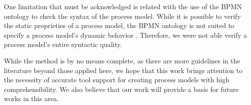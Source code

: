 \documentclass[a4paper,twoside]{article}
\begin{document}
One limitation that must be acknowledged is related with the use of the BPMN ontology to check the syntax of the process model. While it is possible to verify the static proprieties of a process model, the BPMN ontology is not suited to specify  a process model's dynamic behavior \citep{Rospocher2014foisbpmn}. Therefore, we were not able verify a process model's entire syntactic quality.

While the method is by no means complete, as there are more guidelines in the literature beyond those applied here, we hope that this work brings attention to the necessity of accurate tool support for creating process models with high comprehensibility. We also believe that our work will provide a basis for future works in this area.




\end{document}
